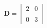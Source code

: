 \documentclass[preview]{standalone}
\begin{document}
\begin{align*}
\mathbf{D} = \begin{bmatrix} 2 & 0 \\ \\0 &  3 \end{bmatrix}
\end{align*}
\end{document}
